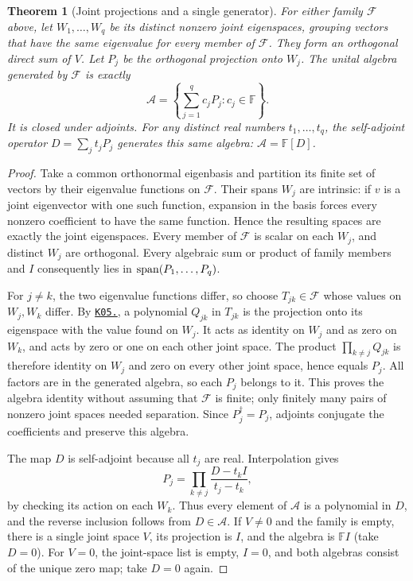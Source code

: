\documentclass[11pt,a4paper]{book}
\newtheorem{theorem}{Theorem}[chapter]
\theoremstyle{definition}\newtheorem{definition}[theorem]{Definition}
\theoremstyle{remark}\newtheorem{remark}[theorem]{Remark}
\newcommand{\kref}[1]{\hyperref[k:#1]{\texttt{K05.\detokenize{#1}}}}
\begin{document}
\begin{theorem}[Joint projections and a single generator]
For either family $\mathcal F$ above, let $W_1,\ldots,W_q$ be its distinct nonzero joint eigenspaces, grouping vectors that have the same eigenvalue for every member of $\mathcal F$. They form an orthogonal direct sum of $V$. Let $P_j$ be the orthogonal projection onto $W_j$. The unital algebra generated by $\mathcal F$ is exactly
\[
\mathcal A=\left\{\sum_{j=1}^q c_jP_j:c_j\in\mathbb F\right\}.
\]
It is closed under adjoints. For any distinct real numbers $t_1,\ldots,t_q$, the self-adjoint operator $D=\sum_jt_jP_j$ generates this same algebra: $\mathcal A=\mathbb F[D]$.
\end{theorem}
\begin{proof}
Take a common orthonormal eigenbasis and partition its finite set of vectors by their eigenvalue functions on $\mathcal F$. Their spans $W_j$ are intrinsic: if $v$ is a joint eigenvector with one such function, expansion in the basis forces every nonzero coefficient to have the same function. Hence the resulting spaces are exactly the joint eigenspaces. Every member of $\mathcal F$ is scalar on each $W_j$, and distinct $W_j$ are orthogonal. Every algebraic sum or product of family members and $I$ consequently lies in $\operatorname{span}(P_1,\ldots,P_q)$.

For $j\ne k$, the two eigenvalue functions differ, so choose $T_{jk}\in\mathcal F$ whose values on $W_j,W_k$ differ. By \kref{13.algebraic_projections}, a polynomial $Q_{jk}$ in $T_{jk}$ is the projection onto its eigenspace with the value found on $W_j$. It acts as identity on $W_j$ and as zero on $W_k$, and acts by zero or one on each other joint space. The product $\prod_{k\ne j}Q_{jk}$ is therefore identity on $W_j$ and zero on every other joint space, hence equals $P_j$. All factors are in the generated algebra, so each $P_j$ belongs to it. This proves the algebra identity without assuming that $\mathcal F$ is finite; only finitely many pairs of nonzero joint spaces needed separation. Since $P_j^\dagger=P_j$, adjoints conjugate the coefficients and preserve this algebra.

The map $D$ is self-adjoint because all $t_j$ are real. Interpolation gives
\[
P_j=\prod_{k\ne j}\frac{D-t_kI}{t_j-t_k},
\]
by checking its action on each $W_k$. Thus every element of $\mathcal A$ is a polynomial in $D$, and the reverse inclusion follows from $D\in\mathcal A$. If $V\ne0$ and the family is empty, there is a single joint space $V$, its projection is $I$, and the algebra is $\mathbb F I$ (take $D=0$). For $V=0$, the joint-space list is empty, $I=0$, and both algebras consist of the unique zero map; take $D=0$ again.
\end{proof}
\end{document}
